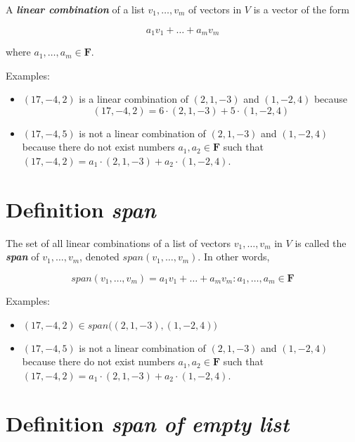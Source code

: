 \documentclass[12pt, letterpaper, oneside]{book}
\begin{document}
A \textbf{\textit{linear combination}} of a list $v_1, \ldots, v_m$ of vectors
in $V$ is a vector of the form

\[
  a_1v_1 + \dots + a_mv_m
\]

where $a_1, \ldots, a_m \in \mathbf{F}$.

Examples:

\begin{itemize}
  \item $(17, -4, 2)$ is a linear combination of $(2, 1, -3)$ and $(1, -2, 4)$
    because
    \[
      (17, -4, 2) = 6 \cdot (2, 1, -3) + 5 \cdot (1, -2, 4)
    \]
  \item $(17, -4, 5)$ is not a linear combination of $(2, 1, -3)$ and
    $(1, -2, 4)$ because there do not exist numbers $a_1, a_2 \in \mathbf{F}$
    such that $(17, -4, 2) = a_1 \cdot (2, 1, -3) + a_2 \cdot (1, -2, 4)$.
\end{itemize}

\section{Definition \textbf{\textit{span}}}

The set of all linear combinations of a list of vectors $v_1, \ldots, v_m$ in
$V$ is called the \textbf{\textit{span}} of $v_1, \ldots, v_m$, denoted
$span(v_1, \ldots, v_m)$. In other words,

\[
  span(v_1, \ldots, v_m) = {a_1v_1 + \ldots + a_mv_m: a_1, \ldots, a_m \in
  \mathbf{F}}
\]

Examples:

\begin{itemize}
  \item $(17, -4, 2) \in span\bigl((2, 1, -3), (1, -2, 4)\bigr)$
  \item $(17, -4, 5)$ is not a linear combination of $(2, 1, -3)$ and
    $(1, -2, 4)$ because there do not exist numbers $a_1, a_2 \in \mathbf{F}$
    such that $(17, -4, 2) = a_1 \cdot (2, 1, -3) + a_2 \cdot (1, -2, 4)$.
\end{itemize}

\section{Definition \textbf{\textit{span of empty list}}}
\end{document}

